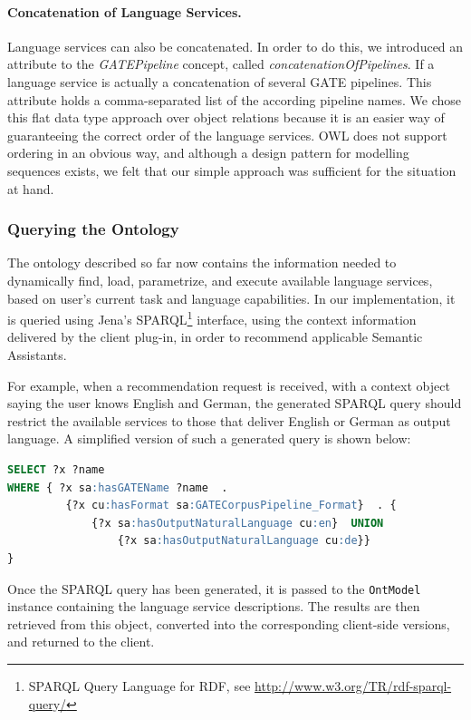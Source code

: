 \paragraph{Concatenation of Language Services.}
Language services can also be concatenated. In order to do this, we
introduced an attribute to the \emph{GATEPipeline} concept, called
\emph{concatenationOfPipelines}. If a language service is actually a
concatenation of several GATE pipelines. This attribute holds a
comma-separated list of the according pipeline names. We chose this
flat data type approach over object relations because it is an easier
way of guaranteeing the correct order of the language services. OWL
does not support ordering in an obvious way, and although a design
pattern for modelling sequences exists, %
we felt that our simple approach was sufficient for the situation at
hand.


\subsubsection{Querying the \sa Ontology}
The ontology described so far now contains the information
needed to dynamically find, load, parametrize, and execute available
language services, based on user's current task and language
capabilities.  In our implementation, it is queried using Jena's
SPARQL\footnote{SPARQL Query Language for RDF, see
  \url{http://www.w3.org/TR/rdf-sparql-query/}} interface, using the
context information delivered by the client plug-in, in order to
recommend applicable Semantic Assistants.

For example, when a recommendation request is received, with a context
object saying the user knows English and German, the generated SPARQL
query should restrict the available services to those that deliver
English or German as output language. A simplified version of such a
generated query is shown below:

\begin{lstlisting}[language=SQL,xleftmargin=8mm,columns=flexible]
SELECT ?x ?name
WHERE { ?x sa:hasGATEName ?name  .
         {?x cu:hasFormat sa:GATECorpusPipeline_Format}  . {
             {?x sa:hasOutputNaturalLanguage cu:en}  UNION 
                 {?x sa:hasOutputNaturalLanguage cu:de}}
}
\end{lstlisting}
Once the SPARQL query has been generated, it is passed to the
\texttt{OntModel} instance containing the language service
descriptions. The results are then retrieved from this object,
converted into the corresponding client-side versions, and returned to
the client.



